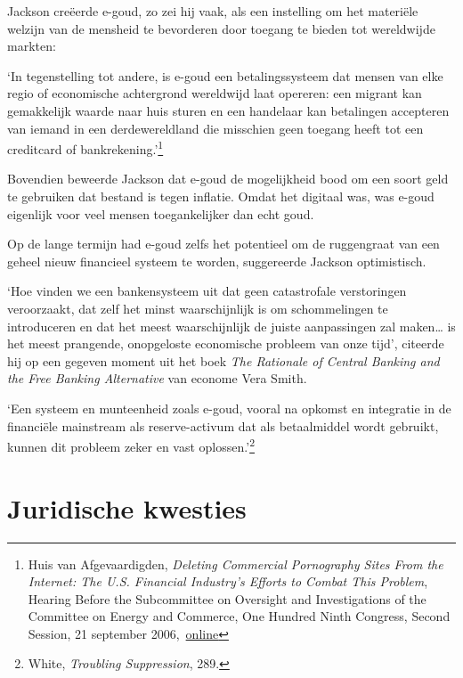 \documentclass[
  a5paper,
  smalldemyvopaper,11pt,twoside,onecolumn,openright,extrafontsizes,
hidelinks]{memoir}
\renewenvironment{quote}%
               {\list{}{\rightmargin=.3cm\leftmargin=.3cm}%
                \itshape \item[]}%
               {\endlist}
\begin{document}
Jackson creëerde e-goud, zo zei hij vaak, als een instelling om het
materiële welzijn van de mensheid te bevorderen door toegang te bieden
tot wereldwijde markten:

\begin{quote}
`In tegenstelling tot andere, is e-goud een betalingssysteem dat mensen
van elke regio of economische achtergrond wereldwijd laat opereren: een
migrant kan gemakkelijk waarde naar huis sturen en een handelaar kan
betalingen accepteren van iemand in een derdewereldland die misschien
geen toegang heeft tot een creditcard of bankrekening.'\footnote{Huis
  van Afgevaardigden, \emph{Deleting Commercial Pornography Sites From
  the Internet: The U.S. Financial Industry's Efforts to Combat This
  Problem}, Hearing Before the Subcommittee on Oversight and
  Investigations of the Committee on Energy and Commerce, One Hundred
  Ninth Congress, Second Session, 21 september
  2006,~\href{https://www.govinfo.gov/content/pkg/CHRG-109hhrg31467/html/CHRG-109hhrg31467.htm}{online}}
\end{quote}

Bovendien beweerde Jackson dat e-goud de mogelijkheid bood om een soort
geld te gebruiken dat bestand is tegen inflatie. Omdat het digitaal was,
was e-goud eigenlijk voor veel mensen toegankelijker dan echt goud.

Op de lange termijn had e-goud zelfs het potentieel om de ruggengraat
van een geheel nieuw financieel systeem te worden, suggereerde Jackson
optimistisch.

`Hoe vinden we een bankensysteem uit dat geen catastrofale verstoringen
veroorzaakt, dat zelf het minst waarschijnlijk is om schommelingen te
introduceren en dat het meest waarschijnlijk de juiste aanpassingen zal
maken\ldots{} is het meest prangende, onopgeloste economische probleem
van onze tijd', citeerde hij op een gegeven moment uit het boek
\emph{The Rationale of Central Banking and the Free Banking Alternative}
van econome Vera Smith.

\begin{quote}
`Een systeem en munteenheid zoals e-goud, vooral na opkomst en
integratie in de financiële mainstream als reserve-activum dat als
betaalmiddel wordt gebruikt, kunnen dit probleem zeker en vast
oplossen.'\footnote{\hspace{0pt}White, \emph{Troubling Suppression},
  289.}
\end{quote}

\section*{Juridische kwesties}\label{juridische-kwesties}
\end{document}
